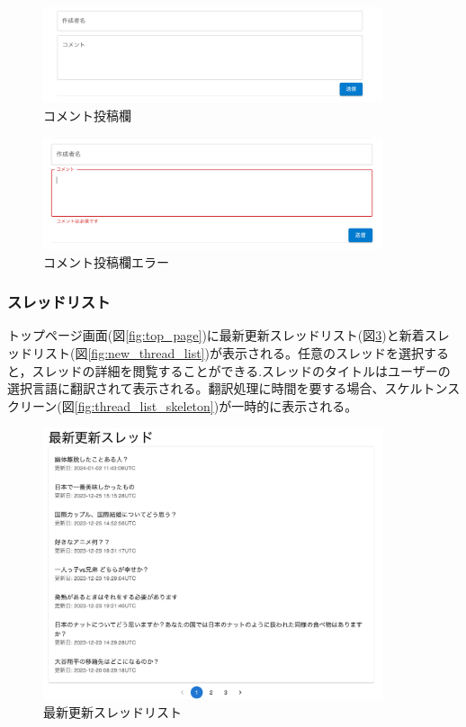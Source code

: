 \documentclass[b5paper,12pt,dvipdfmx]{jsreport}
\begin{document}
\begin{figure}[H]
	\centering
    \includegraphics[width=100mm,height=28.19mm]{./img/feature/comment_textfield.png}
	\caption{コメント投稿欄}
	\label{fig:comment_textfield}
\end{figure}

\begin{figure}[H]
	\centering
    \includegraphics[width=100mm,height=32.90mm]{./img/feature/comment_textfield_error.png}
	\caption{コメント投稿欄エラー}
	\label{fig:comment_textfield_error}
\end{figure}

\subsubsection{スレッドリスト}
トップページ画面(図\ref{fig:top_page})に最新更新スレッドリスト(図\ref{fig:latest_update_thread_list})と新着スレッドリスト(図\ref{fig:new_thread_list})が表示される。任意のスレッドを選択すると，スレッドの詳細を閲覧することができる.スレッドのタイトルはユーザーの選択言語に翻訳されて表示される。翻訳処理に時間を要する場合、スケルトンスクリーン(図\ref{fig:thread_list_skeleton})が一時的に表示される。

\begin{figure}[H]
	\centering
    \includegraphics[width=100mm,height=79.79mm]{./img/feature/latest_update_thread_list.png}
	\caption{最新更新スレッドリスト}
	\label{fig:latest_update_thread_list}
\end{figure}
\end{document}
